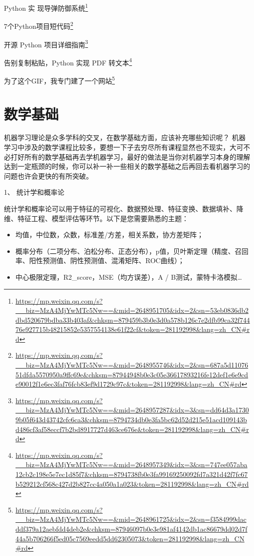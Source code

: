 \documentclass[]{ctexbook}
\renewcommand{\href}[2]{#2\footnote{\url{#1}}}
\begin{document}
\href{https://mp.weixin.qq.com/s?__biz=MzA4MjYwMTc5Nw==\&mid=2648951705\&idx=2\&sn=53eb0836db2dbd520679bdba33b403af\&chksm=879459b3b0e3d0a578b126c7e2dfb99ca32f74476e927715b48215852e5357554138e61f22cf\&token=281192998\&lang=zh_CN\#rd}{Python 实 现导弹防御系统}

\href{https://mp.weixin.qq.com/s?__biz=MzA4MjYwMTc5Nw==\&mid=2648955746\&idx=2\&sn=687a5d1107651dfda5570950a9ffc69e\&chksm=87944948b0e3c05e36617893216fe12def1e6e9cde90012f1e6ec3faf76fcb83ef9d1729c97c\&token=281192998\&lang=zh_CN\#rd}{7个Python项目短代码}

\href{https://mp.weixin.qq.com/s?__biz=MzA4MjYwMTc5Nw==\&mid=2648957287\&idx=3\&sn=dd64d3a17309b05f643d43742cfc6ca3\&chksm=8794734db0e3fa5bc62d52d215e51acd109143bd486cf3af58eccf7b2bd8917727d463ce676e\&token=281192998\&lang=zh_CN\#rd}{开源 Python 项目详细指南}

\href{https://mp.weixin.qq.com/s?__biz=MzA4MjYwMTc5Nw==\&mid=2648957349\&idx=3\&sn=747ee057aba12cb2c198e5e7ec1d85f7\&chksm=8794738fb0e3fa99169250092fd7a321d42f7fc67b529212cf568c427d2b827cc4a050a1a023\&token=281192998\&lang=zh_CN\#rd}{告别复制粘贴，Python 实现 PDF 转文本}

\href{https://mp.weixin.qq.com/s?__biz=MzA4MjYwMTc5Nw==\&mid=2648961725\&idx=2\&sn=f3584999dacddf379a12aebfdd4deb2e\&chksm=87946097b0e3e981af4142db1ac86679dd02d7f44a5b706266f5ed05c7569eedd5dd62305073\&token=281192998\&lang=zh_CN\#rd}{为了这个GIF，我专门建了一个网站}

\hypertarget{ux6570ux5b66ux57faux7840}{%
\chapter{数学基础}\label{ux6570ux5b66ux57faux7840}}

机器学习理论是众多学科的交叉，在数学基础方面，应该补充哪些知识呢？
机器学习中涉及的数学课程比较多，要想一下子去穷尽所有课程显然也不现实，大可不必打好所有的数学基础再去学机器学习，最好的做法是当你对机器学习本身的理解达到一定瓶颈的时候，你可以补一补一些相关的数学基础之后再回去看机器学习的问题也许会更快的有所突破。

1、 统计学和概率论

统计学和概率论可以用于特征的可视化、数据预处理、特征变换、数据填补、降维、特征工程、模型评估等环节。以下是您需要熟悉的主题：

\begin{itemize}
\item
  均值，中位数，众数，标准差/方差，相关系数，协方差矩阵；
\item
  概率分布（二项分布、泊松分布、正态分布），p值，贝叶斯定理（精度、召回率、阳性预测值、阴性预测值、混淆矩阵、ROC曲线）；
\item
  中心极限定理，R2\_score，MSE（均方误差），A / B测试，蒙特卡洛模拟\ldots{}
\end{itemize}
\end{document}
